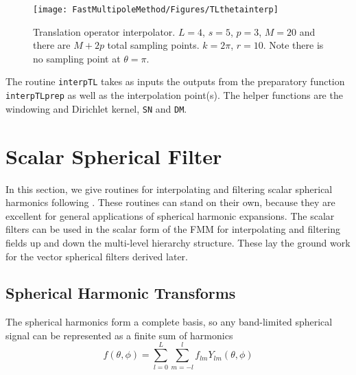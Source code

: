 \begin{figure}[H] 
   \centering
   \texttt{[image: FastMultipoleMethod/Figures/TLthetainterp]} 
   \caption{Translation operator interpolator.  $L = 4$, $s = 5$, $p = 3$, $M = 20$ and there are $M + 2p$ total sampling points.  $k = 2\pi$, $r = 10$. Note there is no sampling point at $\theta = \pi$.}
   \label{fig5}
\end{figure}

The routine \texttt{interpTL} takes as inputs the outputs from the preparatory function \texttt{interpTLprep} as well as the interpolation point(s).  The helper functions are the windowing and Dirichlet kernel, \texttt{SN} and \texttt{DM}.  


{\footnotesize
{}
}

{\footnotesize
{}
}

{\footnotesize
{}
}

{\footnotesize
{}
}




\section{Scalar Spherical Filter}
\label{sec:scasphfilter}

In this section, we give routines for interpolating and filtering scalar spherical harmonics following \cite{yucel2008helmholtz}. These routines can stand on their own, because they are excellent for general applications of spherical harmonic expansions. The scalar filters can be used in the scalar form of the FMM for interpolating and filtering fields up and down the multi-level hierarchy structure. These lay the ground work for the vector spherical filters derived later.

\subsection{Spherical Harmonic Transforms}

The spherical harmonics form a complete basis, so any band-limited spherical signal can be represented as a finite sum of harmonics
\begin{equation}
f(\theta,\phi) = \sum_{l=0}^{L} \sum_{m = -l}^{l} f_{lm} Y_{lm}(\theta,\phi)
\label{c6eq1}
\end{equation}


